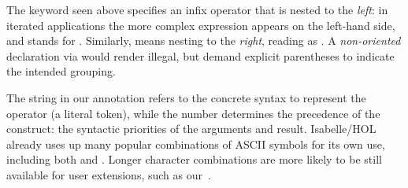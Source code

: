 \begin{isabellebody}
\begin{isamarkuptext}
  The keyword  seen above specifies an
  infix operator that is nested to the \emph{left}: in iterated
  applications the more complex expression appears on the left-hand
  side, and  stands for .  Similarly,  means nesting to the
  \emph{right}, reading  as .  A \emph{non-oriented} declaration via 
  would render  illegal, but demand explicit
  parentheses to indicate the intended grouping.

  The string  in our annotation refers to the
  concrete syntax to represent the operator (a literal token), while
  the number  determines the precedence of the construct:
  the syntactic priorities of the arguments and result.  Isabelle/HOL
  already uses up many popular combinations of ASCII symbols for its
  own use, including both  and .  Longer
  character combinations are more likely to be still available for
  user extensions, such as our~.


\end{isamarkuptext}
\end{isabellebody}
